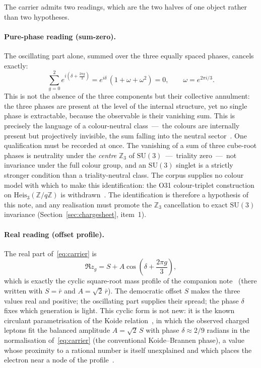 \documentclass[11pt]{article}
\theoremstyle{definition}
\theoremstyle{remark}
\begin{document}
    The carrier admits two readings, which are the two halves of one object rather than two hypotheses.

    \paragraph{Pure-phase reading (sum-zero).}
      The oscillating part alone, summed over the three equally spaced phases, cancels exactly:
      \begin{equation}
        \label{eq:sumzero}
        \sum_{g=0}^{2} e^{i\left(\delta + \frac{2\pi g}{3}\right)}
        = e^{i\delta}\,(1 + \omega + \omega^2) = 0, \qquad \omega = e^{2\pi i/3} .
      \end{equation}
      This is not the absence of the three components but their collective annulment: the three phases are present
      at the level of the internal structure, yet no single phase is extractable, because the observable is their
      vanishing sum.
      This is precisely the language of a colour-neutral class~---~the colours are internally present but
      projectively invisible, the sum falling into the neutral sector~\cite{Beau2026l}.
      One qualification must be recorded at once.
      The vanishing of a sum of three cube-root phases is neutrality under the \emph{centre} $\mathbb{Z}_3$ of
      $\mathrm{SU}(3)$~---~triality zero~---~not invariance under the full colour group, and an $\mathrm{SU}(3)$
      singlet is a strictly stronger condition than a triality-neutral class.
      The corpus supplies no colour model with which to make this identification: the O31 colour-triplet
      construction on $\mathrm{Heis}_3(\mathbb{Z}/q\mathbb{Z})$ is withdrawn~\cite{Beau2026a35}.
      The identification is therefore a hypothesis of this note, and any realisation must promote the
      $\mathbb{Z}_3$ cancellation to exact $\mathrm{SU}(3)$ invariance (Section~\ref{sec:chargesheet}, item~1).

    \paragraph{Real reading (offset profile).}
      The real part of~\eqref{eq:carrier} is
      \begin{equation}
        \label{eq:realprofile}
        \Re z_g = S + A\cos\!\left(\delta + \frac{2\pi g}{3}\right),
      \end{equation}
      which is exactly the cyclic square-root mass profile of the companion note~\cite{Beau2026kud} (there written
      with $S = \bar r$ and $A = \sqrt2\,\bar r$).
      The democratic offset $S$ makes the three values real and positive; the oscillating part supplies their
      spread; the phase $\delta$ fixes which generation is light.
      This cyclic form is not new: it is the known circulant parametrisation of the Koide
      relation~\cite{Koide1982}, in which the observed charged leptons fit the balanced amplitude $A = \sqrt2\,S$
      with phase $\delta \approx 2/9$ radians in the normalisation of~\eqref{eq:carrier} (the conventional
      Koide--Brannen phase), a value whose proximity to a rational number is itself unexplained and which places
      the electron near a node of the profile~\cite{Brannen2006, RiveroGsponer2005}.
\end{document}
